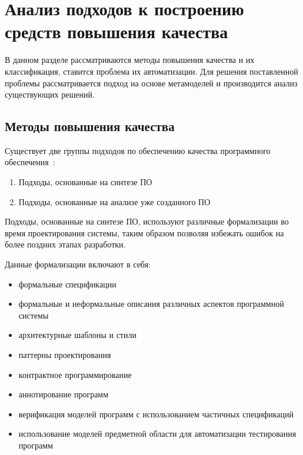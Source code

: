 \chapter{Анализ подходов к построению средств повышения качества}
\label{chap:analisys}

В данном разделе рассматриваются методы повышения качества и их классификация,
ставится проблема их автоматизации. Для решения поставленной проблемы
рассматривается подход на основе метамоделей и производится анализ существующих
решений.


\section{Методы повышения качества}
\label{sec:quality_methods}

Существует две группы подходов по обеспечению качества программного
обеспечения~\cite{itsykson}:

\begin{enumerate}
    \item Подходы, основанные на синтезе ПО
    \item Подходы, основанные на анализе уже созданного ПО
\end{enumerate}

Подходы, основанные на синтезе ПО, используют различные формализации во время
проектирования системы, таким образом позволяя избежать ошибок на более поздних
этапах разработки.

Данные формализации включают в себя:

\begin{itemize}
    \item формальные спецификации
    \item формальные и неформальные описания различных аспектов программной
    системы
    \item архитектурные шаблоны и стили
    \item паттерны проектирования
    \item контрактное программирование
    \item аннотирование программ
    \item верификация моделей программ с использованием частичных спецификаций
    \item использование моделей предметной области для автоматизации
    тестирования программ
\end{itemize}

